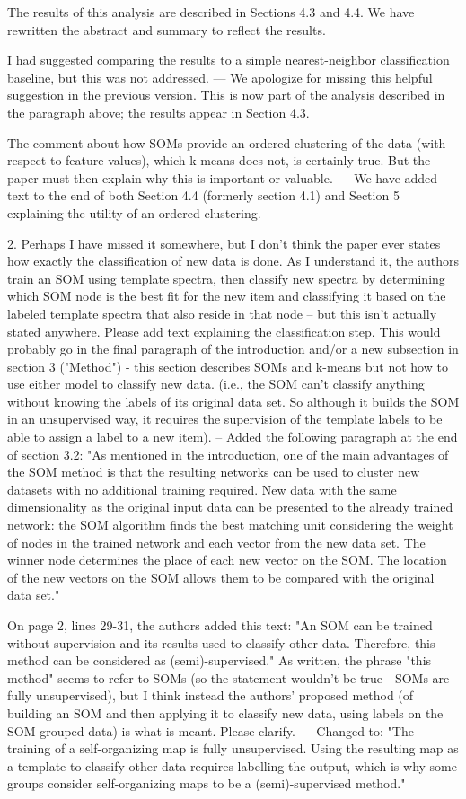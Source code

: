 The results of this analysis are described in Sections 4.3 and 4.4. We have rewritten the abstract and summary to reflect the results.

I had suggested comparing the results to a simple nearest-neighbor classification baseline, but this was not addressed.
--- We apologize for missing this helpful suggestion in the previous version. This is now part of the analysis described in the paragraph above; the results appear in Section 4.3.

The comment about how SOMs provide an ordered clustering of the data (with respect to feature values), which k-means does not, is certainly true.  But the paper must then explain why this is important or valuable.
--- We have added text to the end of both Section 4.4 (formerly section 4.1) and Section 5 explaining the utility of an ordered clustering.

2. Perhaps I have missed it somewhere, but I don't think the paper ever states how exactly the classification of new data is done.  As I understand it, the authors train an SOM using template spectra, then classify new spectra by determining which SOM node is the best fit for the new item and classifying it based on the labeled template spectra that also reside in that node -- but this isn't actually stated anywhere.  Please add text explaining the classification step.  This would probably go in the final paragraph of the introduction and/or a new subsection in section 3 ("Method") - this section describes SOMs and k-means but not how to use either model to classify new data. (i.e., the SOM can't classify anything without knowing the labels of its original data set.  So although it builds the SOM in an unsupervised way, it requires the supervision of the template labels to be able to assign a label to a new item).
-- Added the following paragraph  at the end of section 3.2: 
    "As mentioned in the introduction, one of the main advantages of the SOM method  is that the resulting networks can be used to cluster new datasets with no additional training required. 
     New data with the same dimensionality as the original input data can be presented to the already trained network: the SOM algorithm finds the best matching unit considering the weight of nodes in the trained network and each vector from the new data set.
     The winner node determines the place of each new vector on the SOM.
     The location of the new vectors on the SOM allows them to be compared with the original data set."

On page 2, lines 29-31, the authors added this text: "An SOM can be trained without supervision and its results used to classify other data. Therefore, this method can be considered as (semi)-supervised." As written, the phrase "this method" seems to refer to SOMs (so the statement wouldn't be true - SOMs are fully unsupervised), but I think instead the authors' proposed method (of building an SOM and then applying it to classify new data, using labels on the SOM-grouped data) is what is meant.  Please clarify.
--- Changed to: 
    "The training of a self-organizing map is fully unsupervised.
     Using the resulting map as a template to classify other data requires labelling the output, which is why some groups consider self-organizing maps to be a (semi)-supervised method."

